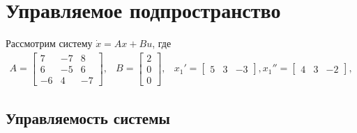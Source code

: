 \section{Управляемое подпространство}

Рассмотрим систему $\dot{x} = Ax + Bu$, где 
\begin{equation}
    \begin{array}{ccc}
        A = \begin{bmatrix}
            7 & -7 & 8 \\
            6 & -5 & 6 \\
            -6 & 4 & -7
        \end{bmatrix}, &
        B = \begin{bmatrix}
            2 \\
            0 \\
            0
        \end{bmatrix}, &
        x_1' = \begin{bmatrix}
            5 & 3 & -3
        \end{bmatrix},
        x_1'' = \begin{bmatrix}
            4 & 3 & -2
        \end{bmatrix},
    \end{array}
\end{equation}

\subsection{Управляемость системы}
